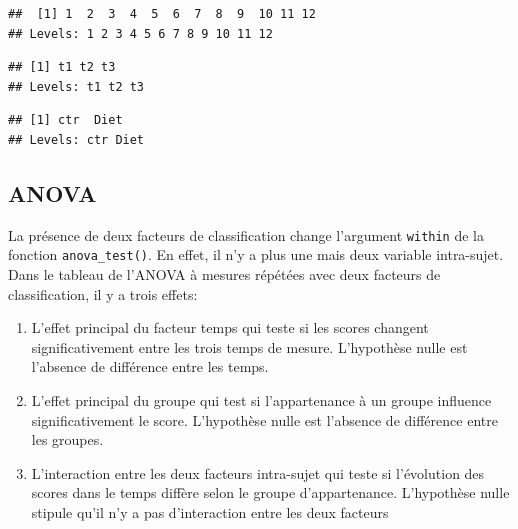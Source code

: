 \documentclass[
]{book}
\newenvironment{Shaded}{\begin{snugshade}}{\end{snugshade}}
\newcommand{\FunctionTok}[1]{\textcolor[rgb]{0.13,0.29,0.53}{\textbf{#1}}}
\newcommand{\NormalTok}[1]{#1}
\newcommand{\SpecialCharTok}[1]{\textcolor[rgb]{0.81,0.36,0.00}{\textbf{#1}}}
\providecommand{\tightlist}{%
  \setlength{\itemsep}{0pt}\setlength{\parskip}{0pt}}
\begin{document}
\begin{verbatim}
##  [1] 1  2  3  4  5  6  7  8  9  10 11 12
## Levels: 1 2 3 4 5 6 7 8 9 10 11 12
\end{verbatim}

\begin{Shaded}
\end{Shaded}

\begin{verbatim}
## [1] t1 t2 t3
## Levels: t1 t2 t3
\end{verbatim}

\begin{Shaded}
\end{Shaded}

\begin{verbatim}
## [1] ctr  Diet
## Levels: ctr Diet
\end{verbatim}

\subsection{ANOVA}\label{anova}

La présence de deux facteurs de classification change l'argument \texttt{within} de la fonction \texttt{anova\_test()}. En effet, il n'y a plus une mais deux variable intra-sujet. Dans le tableau de l'ANOVA à mesures répétées avec deux facteurs de classification, il y a trois effets:

\begin{enumerate}
\def\labelenumi{\arabic{enumi}.}
\tightlist
\item
  L'effet principal du facteur temps qui teste si les scores changent significativement entre les trois temps de mesure. L'hypothèse nulle est l'absence de différence entre les temps.
\item
  L'effet principal du groupe qui test si l'appartenance à un groupe influence significativement le score. L'hypothèse nulle est l'absence de différence entre les groupes.
\item
  L'interaction entre les deux facteurs intra-sujet qui teste si l'évolution des scores dans le temps diffère selon le groupe d'appartenance. L'hypothèse nulle stipule qu'il n'y a pas d'interaction entre les deux facteurs
\end{enumerate}
\end{document}
